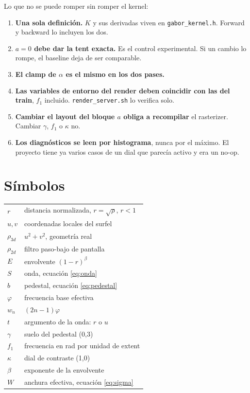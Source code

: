\documentclass[12pt]{extarticle}
\newcommand{\code}[1]{\texttt{#1}}
\begin{document}
Lo que no se puede romper sin romper el kernel:

\begin{enumerate}
\item \textbf{Una sola definición.} $K$ y sus derivadas viven en
      \code{gabor\_kernel.h}. Forward y backward lo incluyen los dos.
\item \textbf{$a=0$ debe dar la tent exacta.} Es el control experimental. Si
      un cambio lo rompe, el baseline deja de ser comparable.
\item \textbf{El clamp de $\alpha$ es el mismo en los dos pases.}
\item \textbf{Las variables de entorno del render deben coincidir con las del
      train}, $f_1$ incluido. \code{render\_server.sh} lo verifica solo.
\item \textbf{Cambiar el layout del bloque $a$ obliga a recompilar} el
      rasterizer. Cambiar $\gamma$, $f_1$ o $\kappa$ no.
\item \textbf{Los diagnósticos se leen por histograma}, nunca por el máximo.
      El proyecto tiene ya varios casos de un dial que parecía activo y era un
      no-op.
\end{enumerate}

\appendix
\section{Símbolos}

\begin{center}\small
\begin{tabular}{@{}ll@{}}
\toprule
$r$ & distancia normalizada, $r=\sqrt{\rho}$, $r<1$ \\
$u,v$ & coordenadas locales del surfel \\
$\rho_{3d}$ & $u^2+v^2$, geometría real \\
$\rho_{2d}$ & filtro paso-bajo de pantalla \\
$E$ & envolvente $(1-r)^\beta$ \\
$S$ & onda, ecuación \eqref{eq:onda} \\
$b$ & pedestal, ecuación \eqref{eq:pedestal} \\
$\varphi$ & frecuencia base efectiva \\
$w_n$ & $(2n-1)\varphi$ \\
$t$ & argumento de la onda: $r$ o $u$ \\
$\gamma$ & suelo del pedestal (0,3) \\
$f_1$ & frecuencia en rad por unidad de extent \\
$\kappa$ & dial de contraste (1,0) \\
$\beta$ & exponente de la envolvente \\
$W$ & anchura efectiva, ecuación \eqref{eq:sigma} \\
\bottomrule
\end{tabular}
\end{center}
\end{document}
